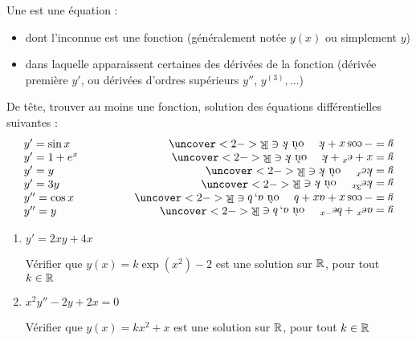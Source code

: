 \begin{frame}
Une  est une équation :
\pause
\begin{itemize}
\item dont l'inconnue est une fonction 
(généralement notée $y(x)$ ou simplement $y$) 

\pause

\item dans laquelle apparaissent certaines des dérivées de la
  fonction (dérivée première $y'$, 
  ou dérivées d'ordres supérieurs $y''$, $y^{(3)},\ldots$)
\end{itemize}
\end{frame}


\begin{frame}

\begin{exemple}
De tête, trouver au moins une fonction, solution des 
équations différentielles suivantes :
$$\begin{array}{lr}
y' = \sin x & \qquad \qquad \uncover<2->{\alenvers{$y = -\cos x + k \quad\text{ où } k \in \Rr$}} \\
y' = 1 + e^x & \qquad \qquad \uncover<2->{\alenvers{$y = x + e^x + k \quad\text{ où } k \in \Rr$}} \\
y' = y & \qquad \qquad \uncover<2->{\alenvers{$y = k e^x \quad\text{ où } k \in \Rr$}} \\
y' = 3y & \qquad \qquad \uncover<2->{\alenvers{$y = k e^{3x} \quad\text{ où } k \in \Rr$}} \\
y'' = \cos x & \qquad \qquad \uncover<2->{\alenvers{$y = -\cos x + ax + b \quad\text{ où } a, b \in \Rr$}} \\
y'' = y & \qquad \qquad \uncover<2->{\alenvers{$y = a e^x + b e^{-x} \quad\text{ où }  a, b \in \Rr$}}  \\  
\end{array}$$
\end{exemple}
\end{frame}


\begin{frame}

\begin{exemple}
\begin{enumerate}
  \item $y' = 2xy+4x$
  
  \pause
  
  Vérifier que $y(x)=k\exp(x^2)-2$ est une solution sur $\mathbb{R}$, 
  pour tout $k\in \mathbb{R}$

  \pause
  
  \item $x^2y''-2y+2x=0$
  
  \pause
  
  Vérifier que $y(x)=kx^2+x$ est une solution sur $\mathbb{R}$, 
  pour tout $k \in \mathbb{R}$
\end{enumerate}
\end{exemple}

\end{frame}



